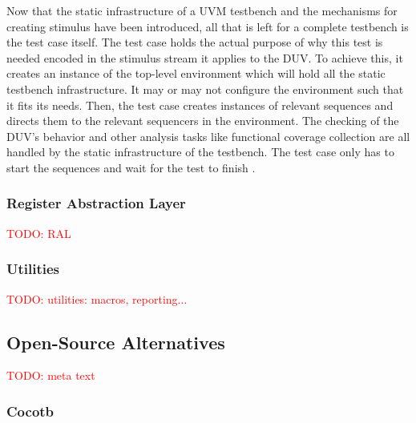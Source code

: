 \documentclass[11pt]{report}
\newcommand{\todo}[1]{\textcolor{red}{TODO: #1}}
\begin{document}
Now that the static infrastructure of a UVM testbench and the mechanisms for creating stimulus have been introduced,
all that is left for a complete testbench is the test case itself. The test case holds the actual purpose of why this
test is needed encoded in the stimulus stream it applies to the DUV. To achieve this, it creates an instance of the
top-level environment which will hold all the static testbench infrastructure. It may or may not configure the
environment such that it fits its needs. Then, the test case creates instances of relevant sequences and directs them
to the relevant sequencers in the environment. The checking of the DUV's behavior and other analysis tasks like
functional coverage collection are all handled by the static infrastructure of the testbench. The test case only has
to start the sequences and wait for the test to finish \cite[Ch. 4.3]{mehta2018asic}.

\subsubsection{Register Abstraction Layer} %

\todo{RAL}


\subsubsection{Utilities} %

\todo{utilities: macros, reporting...}


\subsection{Open-Source Alternatives} %

\todo{meta text}

\subsubsection{Cocotb} %
\end{document}
